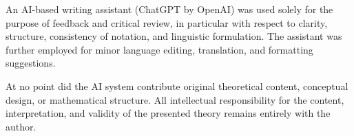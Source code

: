 \documentclass[12pt,a4paper]{article}
\begin{document}
An AI-based writing assistant (ChatGPT by OpenAI) was used solely for the purpose of 
feedback and critical review, in particular with respect to clarity, structure, 
consistency of notation, and linguistic formulation. The assistant was further employed 
for minor language editing, translation, and formatting suggestions.  

At no point did the AI system contribute original theoretical content, conceptual 
design, or mathematical structure. All intellectual responsibility for the content, 
interpretation, and validity of the presented theory remains entirely with the author.

\normalsize
\vspace{2em}

\newpage



\clearpage
{}
{}

\printindex
\end{document}
